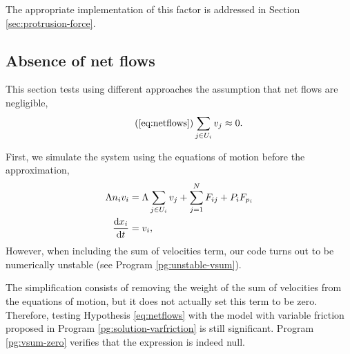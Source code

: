 The appropriate implementation of this factor is addressed in Section \ref{sec:protrusion-force}.


\subsection{Absence of net flows}\label{sec:vsum-zero}

This section tests using different approaches the assumption that net flows are negligible,
\begin{equation}\tag{\ref{eq:netflows}}
    \sum_{j\in U_i}v_j\approx 0.
\end{equation}

First, we simulate the system using the equations of motion before the approximation,
\begin{align}\label{eq:worst}
    \begin{aligned}
        \Lambda n_i v_i &=\Lambda\sum_{j\in U_i}v_j+\sum_{j=1}^{N} F_{ij} + P_i F_{p_i}\\
        \frac{\mathrm{d} x_i}{\mathrm{d} t} &=v_i,
    \end{aligned}
\end{align}
However, when including the sum of velocities term, our code turns out to be numerically unstable (see Program \ref{pg:unstable-vsum}).

The simplification consists of removing the weight of the sum of velocities from the equations of motion, but it does not actually set this term to be zero. Therefore, testing Hypothesis \ref{eq:netflows} with the model with variable friction proposed in Program \ref{pg:solution-varfriction} is still significant. Program \ref{pg:vsum-zero} verifies that the expression is indeed null. 

